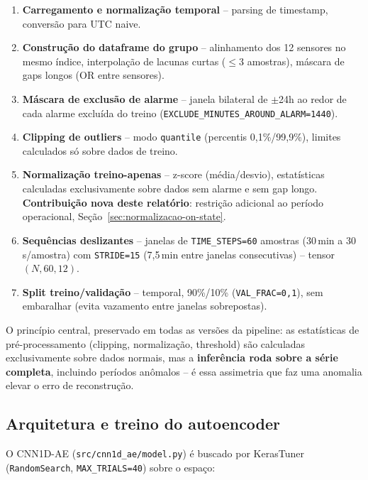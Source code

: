 \documentclass[11pt,a4paper]{article}
\begin{document}
\begin{enumerate}[leftmargin=1.4em]
  \item \textbf{Carregamento e normalização temporal} -- parsing de
    timestamp, conversão para UTC naive.
  \item \textbf{Construção do dataframe do grupo} -- alinhamento dos 12
    sensores no mesmo índice, interpolação de lacunas curtas
    ($\leq$3 amostras), máscara de gaps longos (OR entre sensores).
  \item \textbf{Máscara de exclusão de alarme} -- janela bilateral de
    $\pm$24h ao redor de cada alarme excluída do treino
    (\texttt{EXCLUDE\_MINUTES\_AROUND\_ALARM=1440}).
  \item \textbf{Clipping de outliers} -- modo \texttt{quantile}
    (percentis 0,1\%/99,9\%), limites calculados só sobre dados de
    treino.
  \item \textbf{Normalização treino-apenas} -- z-score (média/desvio),
    estatísticas calculadas exclusivamente sobre dados sem alarme e sem
    gap longo. \textbf{Contribuição nova deste relatório}: restrição
    adicional ao período operacional, Seção~\ref{sec:normalizacao-on-state}.
  \item \textbf{Sequências deslizantes} -- janelas de
    \texttt{TIME\_STEPS=60} amostras (30\,min a 30\,s/amostra) com
    \texttt{STRIDE=15} (7,5\,min entre janelas consecutivas) --
    tensor $(N, 60, 12)$.
  \item \textbf{Split treino/validação} -- temporal, 90\%/10\%
    (\texttt{VAL\_FRAC=0,1}), sem embaralhar (evita vazamento entre
    janelas sobrepostas).
\end{enumerate}

O princípio central, preservado em todas as versões da pipeline: as
estatísticas de pré-processamento (clipping, normalização, threshold)
são calculadas exclusivamente sobre dados normais, mas a
\textbf{inferência roda sobre a série completa}, incluindo períodos
anômalos -- é essa assimetria que faz uma anomalia elevar o erro de
reconstrução.

\subsection{Arquitetura e treino do autoencoder}
\label{sec:arquitetura}

O CNN1D-AE (\texttt{src/cnn1d\_ae/model.py}) é buscado por KerasTuner
(\texttt{RandomSearch}, \texttt{MAX\_TRIALS=40}) sobre o espaço:
\end{document}
